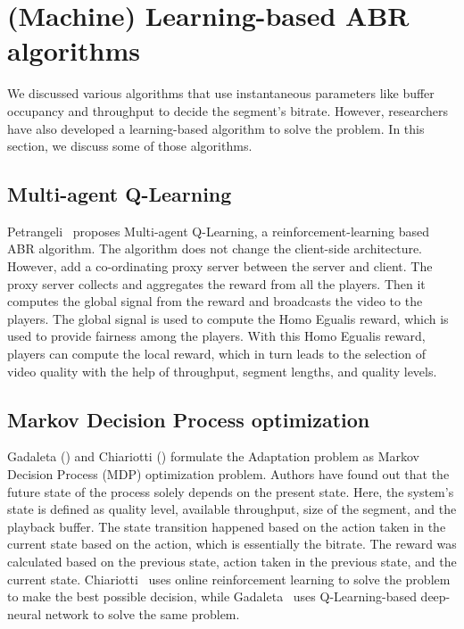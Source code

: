 \section{(Machine) Learning-based ABR algorithms}
We discussed various algorithms that use instantaneous parameters like buffer occupancy and throughput to decide the segment's bitrate. However, researchers have also developed a learning-based algorithm to solve the problem. In this section, we discuss some of those algorithms.

\subsection{Multi-agent Q-Learning}
Petrangeli \etal\ proposes Multi-agent Q-Learning\cite{6838245}, a reinforcement-learning based ABR algorithm. The algorithm does not change the client-side architecture. However, add a co-ordinating proxy server between the server and client. The proxy server collects and aggregates the reward from all the players. Then it computes the global signal from the reward and broadcasts the video to the players. The global signal is used to compute the Homo Egualis\cite{10.5555/1402298.1402344} reward, which is used to provide fairness among the players. With this Homo Egualis reward, players can compute the local reward, which in turn leads to the selection of video quality with the help of throughput, segment lengths, and quality levels.

\subsection{Markov Decision Process optimization}
Gadaleta \etal(\cite{8048013}) and Chiariotti \etal(\cite{10.1145/2910017.2910603}) formulate the Adaptation problem as Markov Decision Process (MDP)\cite{P-1066} optimization problem. Authors have found out that the future state of the process solely depends on the present state. Here, the system's state is defined as quality level, available throughput, size of the segment, and the playback buffer. The state transition happened based on the action taken in the current state based on the action, which is essentially the bitrate. The reward was calculated based on the previous state, action taken in the previous state, and the current state. Chiariotti \etal\ uses online reinforcement learning to solve the problem to make the best possible decision, while Gadaleta \etal\ uses Q-Learning-based deep-neural network to solve the same problem.


